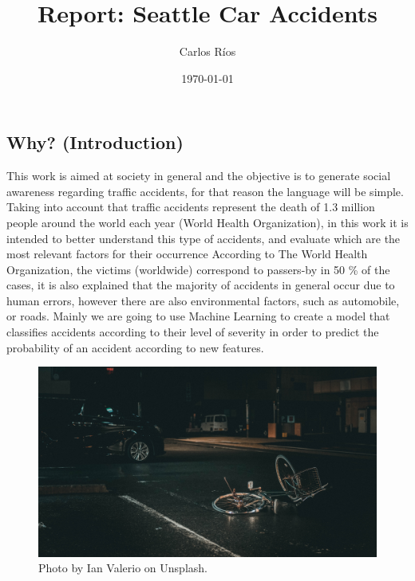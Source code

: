 \documentclass[12pt]{article}
\begin{document}
\title{Report: Seattle Car Accidents }
\author{Carlos Ríos} 
\date{\small{\today}}

\maketitle


\section*{}
\subsection*{Why? (Introduction)}
This work is aimed at society in general and the objective is to generate social awareness regarding traffic accidents, for that reason the language will be simple. Taking into account that traffic accidents represent the death of 1.3 million people around the world each year (World Health Organization), in this work it is intended to better understand this type of accidents, and evaluate which are the most relevant factors for their occurrence According to The World Health Organization, the victims (worldwide) correspond to passers-by in 50 \% of the cases, it is also explained that the majority of accidents in general occur due to human errors, however there are also environmental factors, such as automobile, or roads. Mainly we are going to use Machine Learning to create a model that classifies accidents according to their level of severity in order to predict the probability of an accident according to new features. \

\begin{figure}[htbp]
  \centering
    \includegraphics[width=1\textwidth]{../images/ian-valerio-9UxW_MqBGe4-unsplash.jpg}
  \caption{Photo by Ian Valerio on Unsplash.}
  \label{fig:intro}
\end{figure}
\end{document}

